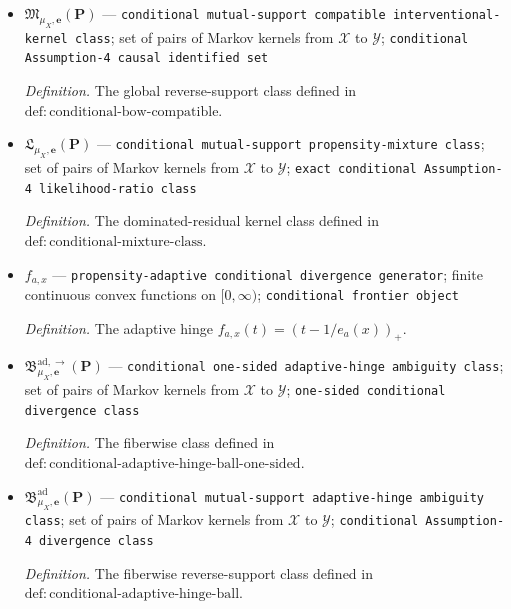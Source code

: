 \documentclass{article}
\begin{document}
\begin{itemize}
  \par\smallskip\noindent\emph{Definition.} The arbitrary-residual kernel class defined in \(\mathrm{def:conditional\text{-}mixture\text{-}class\text{-}one\text{-}sided}\).
  \item \(\mathfrak M_{\mu_X,\boldsymbol e}(\boldsymbol P)\) --- \texttt{conditional mutual-\allowbreak{}support compatible interventional-\allowbreak{}kernel class}; set of pairs of Markov kernels from \(\mathcal X\) to \(\mathcal Y\); \texttt{conditional Assumption-\allowbreak{}4 causal identified set}
  \par\smallskip\noindent\emph{Definition.} The global reverse-support class defined in \(\mathrm{def:conditional\text{-}bow\text{-}compatible}\).
  \item \(\mathfrak L_{\mu_X,\boldsymbol e}(\boldsymbol P)\) --- \texttt{conditional mutual-\allowbreak{}support propensity-\allowbreak{}mixture class}; set of pairs of Markov kernels from \(\mathcal X\) to \(\mathcal Y\); \texttt{exact conditional Assumption-\allowbreak{}4 likelihood-\allowbreak{}ratio class}
  \par\smallskip\noindent\emph{Definition.} The dominated-residual kernel class defined in \(\mathrm{def:conditional\text{-}mixture\text{-}class}\).
  \item \(f_{a,x}\) --- \texttt{propensity-\allowbreak{}adaptive conditional divergence generator}; finite continuous convex functions on \([0,\infty)\); \texttt{conditional frontier object}
  \par\smallskip\noindent\emph{Definition.} The adaptive hinge \(f_{a,x}(t)=(t-1/e_a(x))_+\).
  \item \(\mathfrak B^{\mathrm{ad},\to}_{\mu_X,\boldsymbol e}(\boldsymbol P)\) --- \texttt{conditional one-\allowbreak{}sided adaptive-\allowbreak{}hinge ambiguity class}; set of pairs of Markov kernels from \(\mathcal X\) to \(\mathcal Y\); \texttt{one-\allowbreak{}sided conditional divergence class}
  \par\smallskip\noindent\emph{Definition.} The fiberwise class defined in \(\mathrm{def:conditional\text{-}adaptive\text{-}hinge\text{-}ball\text{-}one\text{-}sided}\).
  \item \(\mathfrak B^{\mathrm{ad}}_{\mu_X,\boldsymbol e}(\boldsymbol P)\) --- \texttt{conditional mutual-\allowbreak{}support adaptive-\allowbreak{}hinge ambiguity class}; set of pairs of Markov kernels from \(\mathcal X\) to \(\mathcal Y\); \texttt{conditional Assumption-\allowbreak{}4 divergence class}
  \par\smallskip\noindent\emph{Definition.} The fiberwise reverse-support class defined in \(\mathrm{def:conditional\text{-}adaptive\text{-}hinge\text{-}ball}\).
\end{itemize}
\end{document}
